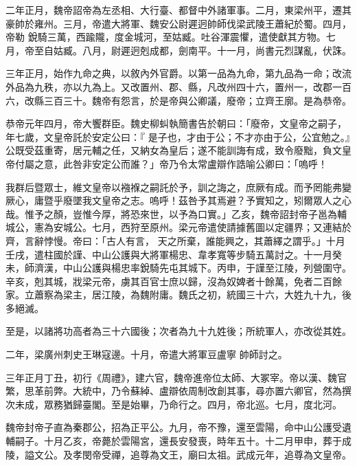 \begin{pinyinscope}
 二年正月，魏帝詔帝為左丞相、大行臺、都督中外諸軍事。二月，東梁州平，遷其豪帥於雍州。三月，帝遣大將軍、魏安公尉遲迥帥師伐梁武陵王蕭紀於蜀。四月，帝勒
 銳騎三萬，西踰隴，度金城河，至姑臧。吐谷渾震懼，遣使獻其方物。七月，帝至自姑臧。八月，尉遲迥剋成都，劍南平。十一月，尚書元烈謀亂，伏誅。



 三年正月，始作九命之典，以敘內外官爵。以第一品為九命，第九品為一命；改流外品為九秩，亦以九為上。又改置州、郡、縣，凡改州四十六，置州一，改郡一百六，改縣三百三十。魏帝有怨言，於是帝與公卿議，廢帝；立齊王廓。是為恭帝。



 恭帝元年四月，帝大饗群臣。魏史柳虯執簡書告於朝曰：「廢帝，文皇帝之嗣子，年七歲，文皇帝託於安定公曰：『
 是子也，才由于公；不才亦由于公，公宜勉之。』公既受茲重寄，居元輔之任，又納女為皇后；遂不能訓誨有成，致令廢黜，負文皇帝付屬之意，此咎非安定公而誰？」帝乃令太常盧辯作誥喻公卿曰：「嗚呼！



 我群后暨眾士，維文皇帝以襁褓之嗣託於予，訓之誨之，庶厥有成。而予罔能弗變厥心，庸暨乎廢墜我文皇帝之志。嗚呼！茲咎予其焉避？予實知之，矧爾眾人之心哉。惟予之顏，豈惟今厚，將恐來世，以予為口實。」乙亥，魏帝詔封帝子邕為輔城公，憲為安城公。七月，西狩至原州。梁元帝遣使請據舊圖以定疆界；又連結於齊，言辭悖慢。帝曰：「古人有言，
 天之所棄，誰能興之，其蕭繹之謂乎。」十月壬戌，遣柱國於謹、中山公護與大將軍楊忠、韋孝寬等步騎五萬討之。十一月癸未，師濟漢，中山公護與楊忠率銳騎先屯其城下。丙申，于謹至江陵，列營圍守。辛亥，剋其城，戕梁元帝，虜其百官士庶以歸，沒為奴婢者十餘萬，免者二百餘家。立蕭察為梁主，居江陵，為魏附庸。魏氏之初，統國三十六，大姓九十九，後多絕滅。



 至是，以諸將功高者為三十六國後；次者為九十九姓後；所統軍人，亦改從其姓。



 二年，梁廣州刺史王琳寇邊。十月，帝遣大將軍豆盧寧
 帥師討之。



 三年正月丁丑，初行《周禮》，建六官，魏帝進帝位太師、大冢宰。帝以漢、魏官繁，思革前弊。大統中，乃令蘇綽、盧辯依周制改創其事，尋亦置六卿官，然為撰次未成，眾務猶歸臺閣。至是始畢，乃命行之。四月，帝北巡。七月，度北河。



 魏帝封帝子直為秦郡公，招為正平公。九月，帝不豫，還至雲陽，命中山公護受遺輔嗣子。十月乙亥，帝薨於雲陽宮，還長安發喪，時年五十。十二月甲申，葬于成陵，謚文公。及孝閔帝受禪，追尊為文王，廟曰太祖。武成元年，追尊為文皇帝。




\end{pinyinscope}
